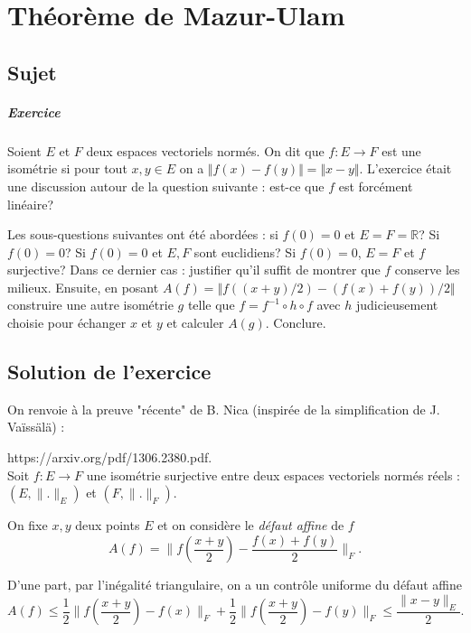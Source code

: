 \chapter{Théorème de Mazur-Ulam}

\section{Sujet}

\paragraph{Exercice}
Soient \( E \) et \( F \) deux espaces vectoriels normés. On dit que \( f : E \rightarrow F \) est une isométrie
si pour tout \( x, y \in E \) on a \( \Vert f(x) - f(y)\Vert = \Vert x - y\Vert \). L'exercice était une discussion autour de la
question suivante : est-ce que \( f \) est forcément linéaire?

Les sous-questions suivantes ont été abordées : si \( f(0) = 0 \) et \( E = F = \mathbb R \)? Si \( f(0) = 0 \)? Si
\( f(0) = 0 \) et \( E, F \) sont euclidiens? Si \( f(0) = 0 \), \( E = F \) et \( f \) surjective? Dans ce dernier cas : justifier
qu'il suffit de montrer que \( f \) conserve les milieux. Ensuite, en posant \( A(f) = \Vert f((x + y)/2) - (f(x) + f(y))/2\Vert \) construire une autre isométrie \( g \) telle que \( f = f^{-1} \circ h \circ f \) avec \( h \) judicieusement
choisie pour échanger \( x \) et \( y \) et calculer \( A(g) \). Conclure.

\section{Solution de l'exercice}

On renvoie à la preuve "récente" de B. Nica (inspirée de la simplification de J. Vaïssälä) :

https://arxiv.org/pdf/1306.2380.pdf.\\

Soit $f : E \rightarrow F$ une isométrie surjective entre deux espaces vectoriels normés réels : $(E,\|.\|_{E})$ et $(F,\|.\|_{F}).$

On fixe $x,y$ deux points $E$ et on considère le \emph{défaut affine} de $f$ $$A(f)=\|f(\frac{x+y}{2})-\frac{f(x)+f(y)}{2}\|_{F}.$$

D'une part, par l'inégalité triangulaire, on a un contrôle uniforme du défaut affine $$A(f)\leq \frac{1}{2}\|f(\frac{x+y}{2})-f(x)\|_{F}+\frac{1}{2}\|f(\frac{x+y}{2})-f(y)\|_{F}\leq \frac{\|x-y\|_{E}}{2}.$$

